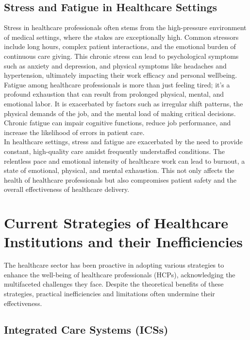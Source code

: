 \subsection{Stress and Fatigue in Healthcare Settings}
Stress in healthcare professionals often stems from the high-pressure environment of medical settings, where the stakes are exceptionally high. Common stressors include long hours, complex patient interactions, and the emotional burden of continuous care giving. This chronic stress can lead to psychological symptoms such as anxiety and depression, and physical symptoms like headaches and hypertension, ultimately impacting their work efficacy and personal wellbeing. \\ 

Fatigue among healthcare professionals is more than just feeling tired; it’s a profound exhaustion that can result from prolonged physical, mental, and emotional labor. It is exacerbated by factors such as irregular shift patterns, the physical demands of the job, and the mental load of making critical decisions. Chronic fatigue can impair cognitive functions, reduce job performance, and increase the likelihood of errors in patient care. \\

\noindent In healthcare settings, stress and fatigue are exacerbated by the need to provide constant, high-quality care amidst frequently understaffed conditions. The relentless pace and emotional intensity of healthcare work can lead to burnout, a state of emotional, physical, and mental exhaustion. This not only affects the health of healthcare professionals but also compromises patient safety and the overall effectiveness of healthcare delivery.


\section{Current Strategies of Healthcare Institutions and their Inefficiencies}

The healthcare sector has been proactive in adopting various strategies to enhance the well-being of healthcare professionals (HCPs), acknowledging the multifaceted challenges they face. Despite the theoretical benefits of these strategies, practical inefficiencies and limitations often undermine their effectiveness.

\subsection{Integrated Care Systems (ICSs)}

